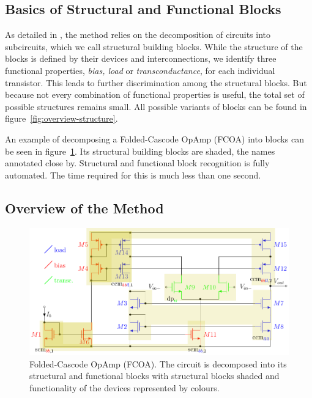 \documentclass[conference]{IEEEtran}
\begin{document}
 	\subsection{Basics of Structural and Functional Blocks}
 	As detailed in \cite{ leibl24inverse}, the method  relies on the decomposition of circuits into subcircuits, which we call structural building blocks.
 	While the structure of the blocks is defined by their devices and interconnections, we identify three functional properties, \textit{bias, load} or \textit{transconductance}, for each individual transistor. This leads to further discrimination among the structural blocks. But because not every combination of functional properties is useful, the total set of possible structures remains small. 
	All possible variants of blocks can be found in figure~\ref{fig:overview-structure}.
	
	An example of decomposing a Folded-Cascode OpAmp (FCOA) into blocks can be seen in figure~\ref{fig:simple53}. Its structural building blocks are shaded, the names annotated close by.
	Structural and functional block recognition is fully automated. The time required for this is much less than one second. 
	
\subsection{Overview of the Method}
	\begin{figure}[]
		\centering
		\includegraphics[width=\linewidth]{figures/simple52_partitioning}
		\caption{Folded-Cascode OpAmp (FCOA). The circuit is decomposed into its structural and functional blocks with structural blocks shaded and functionality of the devices represented by colours. }
		\label{fig:simple53}
	\end{figure}
	
\end{document}
